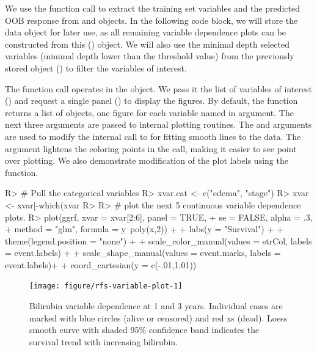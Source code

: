 \documentclass[nojss]{jss}\usepackage[]{graphicx}\usepackage[]{color}
\begin{document}
We use the  function call to extract the training set variables and the predicted OOB response from  and  objects. In the following code block, we will store the  data object for later use, as all remaining variable dependence plots can be constructed from this () object. We will also use the minimal depth selected variables (minimal depth lower than the threshold value) from the previously stored  object () to filter the variables of interest.

The  function call operates in the  object. We pass it the list of variables of interest () and request a single panel () to display the figures. By default, the  function returns a list of  objects, one figure for each variable named in  argument. The next three arguments are passed to internal  plotting routines. The  and  arguments are used to modify the internal call to  for fitting smooth lines to the data. The  argument lightens the coloring points in the  call, making it easier to see point over plotting. We also demonstrate modification of the plot labels using the  function.


\begin{Schunk}
\begin{Sinput}
R> # Pull the categorical variables
R> xvar.cat <- c("edema", "stage")
R> xvar <- xvar[-which(xvar %
R> 
R> # plot the next 5 continuous variable dependence plots.
R> plot(ggrf, xvar = xvar[2:6], panel = TRUE, 
+      se = FALSE, alpha = .3, 
+      method = "glm", formula = y~poly(x,2)) + 
+   labs(y = "Survival") + 
+   theme(legend.position = "none") + 
+   scale_color_manual(values = strCol, labels = event.labels) + 
+   scale_shape_manual(values = event.marks, labels = event.labels)+
+   coord_cartesian(y = c(-.01,1.01))
\end{Sinput}
\begin{figure}[!htpb]

{\centering \texttt{[image: figure/rfs-variable-plot-1]} 

}

\caption[Bilirubin variable dependence at 1 and 3 years]{Bilirubin variable dependence at 1 and 3 years. Individual cases are marked with blue circles (alive or censored) and red xs (dead). Loess smooth curve with shaded 95\% confidence band indicates the survival trend with increasing bilirubin.\label{fig:variable-plot}}
\end{figure}
\end{Schunk}
\end{document}
